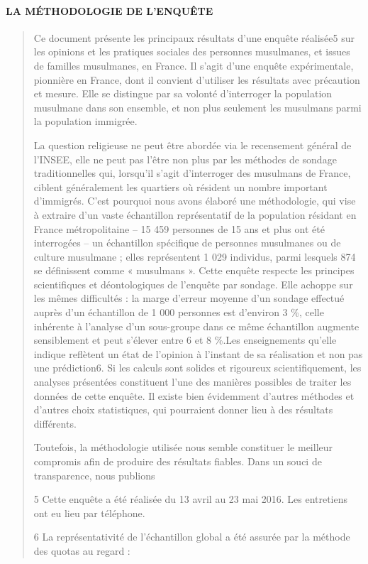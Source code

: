 \hypertarget{la-muxe9thodologie-de-lenquuxeate}{%
\paragraph{LA MÉTHODOLOGIE DE
L'ENQUÊTE}\label{la-muxe9thodologie-de-lenquuxeate}}

\begin{quote}
Ce document présente les principaux résultats d'une enquête réalisée5
sur les opinions et les pratiques sociales des personnes musulmanes, et
issues de familles musulmanes, en France. Il s'agit d'une enquête
expérimentale, pionnière en France, dont il convient d'utiliser les
résultats avec précaution et mesure. Elle se distingue par sa volonté
d'interroger la population musulmane dans son ensemble, et non plus
seulement les musulmans parmi la population immigrée.

La question religieuse ne peut être abordée via le recensement général
de l'INSEE, elle ne peut pas l'être non plus par les méthodes de sondage
traditionnelles qui, lorsqu'il s'agit d'interroger des musulmans de
France, ciblent généralement les quartiers où résident un nombre
important d'immigrés. C'est pourquoi nous avons élaboré une
méthodologie, qui vise à extraire d'un vaste échantillon représentatif
de la population résidant en France métropolitaine -- 15 459 personnes
de 15 ans et plus ont été interrogées -- un échantillon spécifique de
personnes musulmanes ou de culture musulmane ; elles représentent 1 029
individus, parmi lesquels 874 se définissent comme « musulmans ». Cette
enquête respecte les principes scientifiques et déontologiques de
l'enquête par sondage. Elle achoppe sur les mêmes difficultés : la marge
d'erreur moyenne d'un sondage effectué auprès d'un échantillon de 1 000
personnes est d'environ 3 \%, celle inhérente à l'analyse d'un
sous-groupe dans ce même échantillon augmente sensiblement et peut
s'élever entre 6 et 8 \%.Les enseignements qu'elle indique reflètent un
état de l'opinion à l'instant de sa réalisation et non pas une
prédiction6. Si les calculs sont solides et rigoureux scientifiquement,
les analyses présentées constituent l'une des manières possibles de
traiter les données de cette enquête. Il existe bien évidemment d'autres
méthodes et d'autres choix statistiques, qui pourraient donner lieu à
des résultats différents.

Toutefois, la méthodologie utilisée nous semble constituer le meilleur
compromis afin de produire des résultats fiables. Dans un souci de
transparence, nous publions

5 Cette enquête a été réalisée du 13 avril au 23 mai 2016. Les
entretiens ont eu lieu par téléphone.

6 La représentativité de l'échantillon global a été assurée par la
méthode des quotas au regard :
\end{quote}

